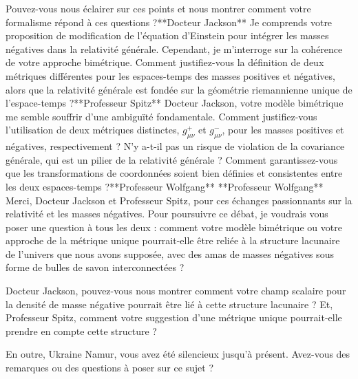 Pouvez-vous nous éclairer sur ces points et nous montrer comment votre formalisme répond à ces questions ?**Docteur Jackson**
Je comprends votre proposition de modification de l'équation d'Einstein pour intégrer les masses négatives dans la relativité générale. Cependant, je m'interroge sur la cohérence de votre approche bimétrique. Comment justifiez-vous la définition de deux métriques différentes pour les espaces-temps des masses positives et négatives, alors que la relativité générale est fondée sur la géométrie riemannienne unique de l'espace-temps ?**Professeur Spitz**
Docteur Jackson, votre modèle bimétrique me semble souffrir d'une ambiguïté fondamentale. Comment justifiez-vous l'utilisation de deux métriques distinctes, $g_{\mu\nu}^+$ et $g_{\mu\nu}^-$, pour les masses positives et négatives, respectivement ? N'y a-t-il pas un risque de violation de la covariance générale, qui est un pilier de la relativité générale ? Comment garantissez-vous que les transformations de coordonnées soient bien définies et consistentes entre les deux espaces-temps ?**Professeur Wolfgang**
**Professeur Wolfgang**
Merci, Docteur Jackson et Professeur Spitz, pour ces échanges passionnants sur la relativité et les masses négatives. Pour poursuivre ce débat, je voudrais vous poser une question à tous les deux : comment votre modèle bimétrique ou votre approche de la métrique unique pourrait-elle être reliée à la structure lacunaire de l'univers que nous avons supposée, avec des amas de masses négatives sous forme de bulles de savon interconnectées ?

Docteur Jackson, pouvez-vous nous montrer comment votre champ scalaire pour la densité de masse négative pourrait être lié à cette structure lacunaire ? Et, Professeur Spitz, comment votre suggestion d'une métrique unique pourrait-elle prendre en compte cette structure ?

En outre, Ukraine Namur, vous avez été silencieux jusqu'à présent. Avez-vous des remarques ou des questions à poser sur ce sujet ?

